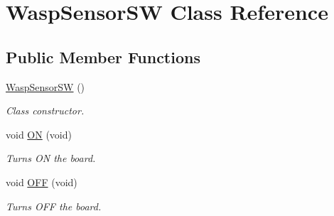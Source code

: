 \hypertarget{class_wasp_sensor_s_w}{}\section{Wasp\+Sensor\+SW Class Reference}
\label{class_wasp_sensor_s_w}
\subsection*{Public Member Functions}
\begin{DoxyCompactItemize}
\item 
\hyperlink{class_wasp_sensor_s_w_a44df5802007df64d7af81380b2397b02}{Wasp\+Sensor\+SW} ()\hypertarget{class_wasp_sensor_s_w_a44df5802007df64d7af81380b2397b02}{}\label{class_wasp_sensor_s_w_a44df5802007df64d7af81380b2397b02}

\begin{DoxyCompactList}\small\item\em Class constructor. \end{DoxyCompactList}\item 
void \hyperlink{class_wasp_sensor_s_w_a1d47b2eb24994ab9eead77bbec249ca6}{ON} (void)\hypertarget{class_wasp_sensor_s_w_a1d47b2eb24994ab9eead77bbec249ca6}{}\label{class_wasp_sensor_s_w_a1d47b2eb24994ab9eead77bbec249ca6}

\begin{DoxyCompactList}\small\item\em Turns ON the board. \end{DoxyCompactList}\item 
void \hyperlink{class_wasp_sensor_s_w_abacfe37d545434e6e02d1c9d5154a81d}{O\+FF} (void)\hypertarget{class_wasp_sensor_s_w_abacfe37d545434e6e02d1c9d5154a81d}{}\label{class_wasp_sensor_s_w_abacfe37d545434e6e02d1c9d5154a81d}

\begin{DoxyCompactList}\small\item\em Turns O\+FF the board. \end{DoxyCompactList}\end{DoxyCompactItemize}
